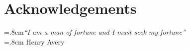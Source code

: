 \chapter*{Acknowledgements} %


\begin{flushright}
\rightskip=.8cm\textit{``I am a man of fortune and I must seek my fortune''} \\
\vspace{.2em}
\rightskip=.8cm Henry Avery
\end{flushright}
\vspace{1em}


% 
% 


% 





